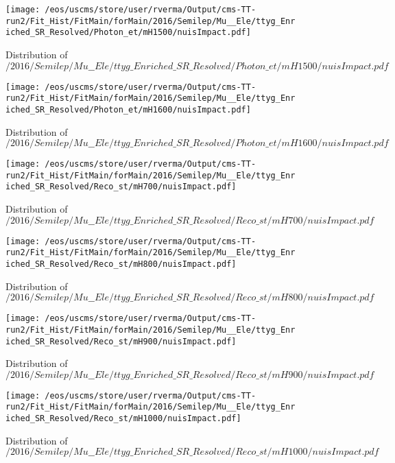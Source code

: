 \begin{figure}
\centering
\texttt{[image: /eos/uscms/store/user/rverma/Output/cms-TT-run2/Fit\_Hist/FitMain/forMain/2016/Semilep/Mu\_\_Ele/ttyg\_Enriched\_SR\_Resolved/Photon\_et/mH1500/nuisImpact.pdf]}
\caption{Distribution of $/2016/Semilep/Mu\_\_Ele/ttyg\_Enriched\_SR\_Resolved/Photon\_et/mH1500/nuisImpact.pdf$}
\end{figure}

\begin{figure}
\centering
\texttt{[image: /eos/uscms/store/user/rverma/Output/cms-TT-run2/Fit\_Hist/FitMain/forMain/2016/Semilep/Mu\_\_Ele/ttyg\_Enriched\_SR\_Resolved/Photon\_et/mH1600/nuisImpact.pdf]}
\caption{Distribution of $/2016/Semilep/Mu\_\_Ele/ttyg\_Enriched\_SR\_Resolved/Photon\_et/mH1600/nuisImpact.pdf$}
\end{figure}

\begin{figure}
\centering
\texttt{[image: /eos/uscms/store/user/rverma/Output/cms-TT-run2/Fit\_Hist/FitMain/forMain/2016/Semilep/Mu\_\_Ele/ttyg\_Enriched\_SR\_Resolved/Reco\_st/mH700/nuisImpact.pdf]}
\caption{Distribution of $/2016/Semilep/Mu\_\_Ele/ttyg\_Enriched\_SR\_Resolved/Reco\_st/mH700/nuisImpact.pdf$}
\end{figure}

\begin{figure}
\centering
\texttt{[image: /eos/uscms/store/user/rverma/Output/cms-TT-run2/Fit\_Hist/FitMain/forMain/2016/Semilep/Mu\_\_Ele/ttyg\_Enriched\_SR\_Resolved/Reco\_st/mH800/nuisImpact.pdf]}
\caption{Distribution of $/2016/Semilep/Mu\_\_Ele/ttyg\_Enriched\_SR\_Resolved/Reco\_st/mH800/nuisImpact.pdf$}
\end{figure}

\begin{figure}
\centering
\texttt{[image: /eos/uscms/store/user/rverma/Output/cms-TT-run2/Fit\_Hist/FitMain/forMain/2016/Semilep/Mu\_\_Ele/ttyg\_Enriched\_SR\_Resolved/Reco\_st/mH900/nuisImpact.pdf]}
\caption{Distribution of $/2016/Semilep/Mu\_\_Ele/ttyg\_Enriched\_SR\_Resolved/Reco\_st/mH900/nuisImpact.pdf$}
\end{figure}

\begin{figure}
\centering
\texttt{[image: /eos/uscms/store/user/rverma/Output/cms-TT-run2/Fit\_Hist/FitMain/forMain/2016/Semilep/Mu\_\_Ele/ttyg\_Enriched\_SR\_Resolved/Reco\_st/mH1000/nuisImpact.pdf]}
\caption{Distribution of $/2016/Semilep/Mu\_\_Ele/ttyg\_Enriched\_SR\_Resolved/Reco\_st/mH1000/nuisImpact.pdf$}
\end{figure}

